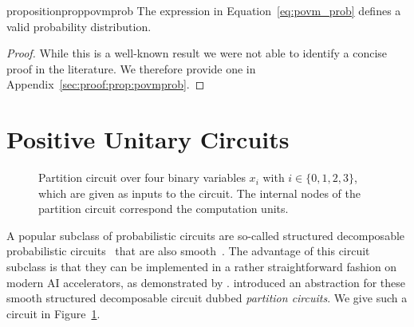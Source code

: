 



\begin{restatable}{proposition}{proppovmprob}
	\label{prop:povmprob}
	The expression in Equation~\ref{eq:povm_prob} defines a valid probability distribution.
\end{restatable}

\begin{proof}
	While this is a well-known result we were not able to identify a concise proof in the literature. We therefore provide one in Appendix~\ref{sec:proof:prop:povmprob}.
\end{proof}





\citep[Corollary 4.2]{baksalary1989some}






















\section{Positive Unitary Circuits}
\label{sec:puncs}

\begin{figure}[t]

	\centering
	

	\caption{
		Partition circuit over four binary variables $x_i$ with $i \in \{0,1,2,3\}$, which are given as inputs to the circuit. The internal nodes of the partition circuit correspond the computation units.}
	\label{fig:circuit}
\end{figure}


A popular subclass of probabilistic circuits are so-called structured decomposable  probabilistic circuits~\citep{darwiche2011sdd} that are also smooth~\citep{darwiche2001tractable}. The advantage of this circuit subclass is that they can be implemented in a rather straightforward fashion on modern AI accelerators, as demonstrated by \citet{peharz2019random,peharz2020einsum}.
\citet{zuidberg2024probabilistic} introduced an abstraction for these smooth structured decomposable circuit dubbed \textit{partition circuits}.
We give such a circuit in Figure~\ref{fig:circuit}.


